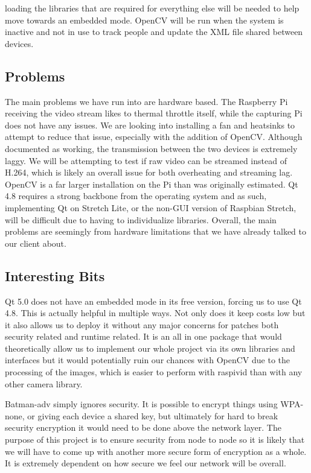 \documentclass[onecolumn, draftclsnofoot,10pt, compsoc]{IEEEtran}
\begin{document}
loading the libraries that are required for everything else will be needed to help move towards an embedded mode. OpenCV will be run when the system is inactive and not in use to track people and update the XML file shared between devices.

\subsection{Problems}
The main problems we have run into are hardware based. The Raspberry Pi receiving the video stream likes to thermal throttle itself, while the capturing Pi does not have any issues. We are looking into installing a fan and heatsinks to attempt to reduce that issue, especially with the addition of OpenCV. Although documented as working, the transmission between the two devices is extremely laggy. We will be attempting to test if raw video can be streamed instead of H.264, which is likely an overall issue for both overheating and streaming lag. OpenCV is a far larger installation on the Pi than was originally estimated. Qt 4.8 requires a strong backbone from the operating system and as such, implementing Qt on Stretch Lite, or the non-GUI version of Raspbian Stretch, will be difficult due to having to individualize libraries. Overall, the main problems are seemingly from hardware limitations that we have already talked to our client about.

\subsection{Interesting Bits}
Qt 5.0 does not have an embedded mode in its free version, forcing us to use Qt 4.8. This is actually helpful in multiple ways. Not only does it keep costs low but it also allows us to deploy it without any major concerns for patches both security related and runtime related. It is an all in one package that would theoretically allow us to implement our whole project via its own libraries and interfaces but it would potentially ruin our chances with OpenCV due to the processing of the images, which is easier to perform with raspivid than with any other camera library.

Batman-adv simply ignores security. It is possible to encrypt things using WPA-none, or giving each device a shared key, but ultimately for hard to break security encryption it would need to be done above the network layer. The purpose of this project is to ensure security from node to node so it is likely that we will have to come up with another more secure form of encryption as a whole. It is extremely dependent on how secure we feel our network will be overall.
\end{document}
